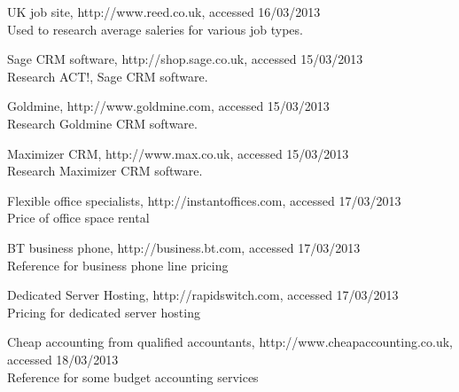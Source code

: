 \documentclass{article}
\begin{document}
\begin{thebibliography}{9}
 UK job site, http://www.reed.co.uk, accessed 16/03/2013
\\Used to research average saleries for various job types.

 Sage CRM software, http://shop.sage.co.uk, accessed 15/03/2013
\\Research ACT!, Sage CRM software.

 Goldmine, http://www.goldmine.com, accessed 15/03/2013
\\Research Goldmine CRM software.

 Maximizer CRM, http://www.max.co.uk, accessed 15/03/2013
\\Research Maximizer CRM software.

 Flexible office specialists, http://instantoffices.com, accessed 17/03/2013
\\Price of office space rental

 BT business phone, http://business.bt.com, accessed 17/03/2013
\\Reference for business phone line pricing

 Dedicated Server Hosting, http://rapidswitch.com, accessed 17/03/2013
\\Pricing for dedicated server hosting

 Cheap accounting from qualified accountants, http://www.cheapaccounting.co.uk, accessed 18/03/2013
\\Reference for some budget accounting services



\end{thebibliography}
\end{document}
